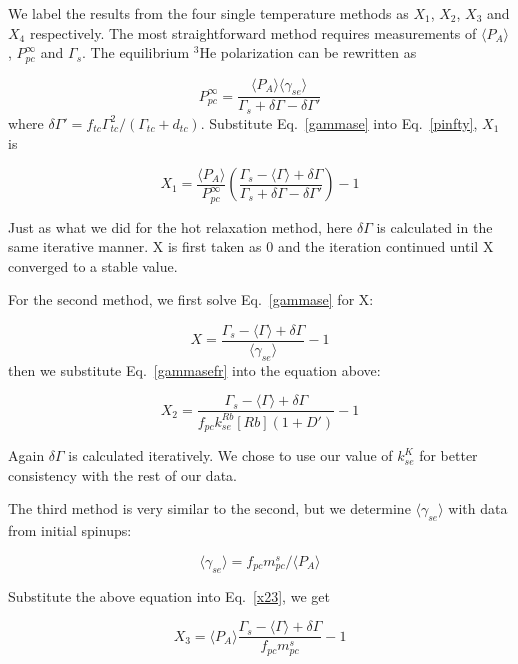 We label the results from the four single temperature methods as $X_1$, $X_2$, $X_3$ and $X_4$ respectively. The most straightforward method requires measurements of $\langle P_A\rangle$, $P_{pc}^\infty$ and $\Gamma_s$. The equilibrium $^3$He polarization can be rewritten as

\begin{equation}\label{pinfty}
P_{pc}^\infty=\frac{\langle P_A\rangle\langle\gamma_{se}\rangle}{\Gamma_s+\delta\Gamma-\delta\Gamma'}
\end{equation}
where $\delta\Gamma'=f_{tc}\Gamma_{tc}^2/(\Gamma_{tc}+d_{tc}).$ Substitute Eq.~\ref{gammase} into Eq.~\ref{pinfty}, $X_1$ is

\begin{equation}
X_1=\frac{\langle P_A\rangle}{P_{pc}^\infty}\left(\frac{\Gamma_s-\langle\Gamma\rangle+\delta\Gamma}{\Gamma_s+\delta\Gamma-\delta\Gamma'}\right)-1
\end{equation}

Just as what we did for the hot relaxation method, here $\delta\Gamma$ is calculated in the same iterative manner. X is first taken as 0 and the iteration continued until X converged to a stable value.

For the second method, we first solve Eq.~\ref{gammase} for X:

\begin{equation}\label{x23}
X=\frac{\Gamma_s-\langle\Gamma\rangle+\delta\Gamma}{\langle\gamma_{se}\rangle}-1
\end{equation}
then we substitute Eq.~\ref{gammasefr} into the equation above:

\begin{equation}
X_2=\frac{\Gamma_s-\langle\Gamma\rangle+\delta\Gamma}{f_{pc}k_{se}^{Rb}[Rb](1+D')}-1
\end{equation}

Again $\delta\Gamma$ is calculated iteratively. We chose to use our value of $k_{se}^{K}$ for better consistency with the rest of our data.

The third method is very similar to the second, but we determine $\langle\gamma_{se}\rangle$ with data from initial spinups:

\begin{equation}
\langle\gamma_{se}\rangle=f_{pc}m_{pc}^{s}/\langle P_A\rangle
\end{equation}

Substitute the above equation into Eq.~\ref{x23}, we get

\begin{equation}
X_3=\langle P_A\rangle\frac{\Gamma_s-\langle\Gamma\rangle+\delta\Gamma}{f_{pc}m_{pc}^s}-1
\end{equation}


